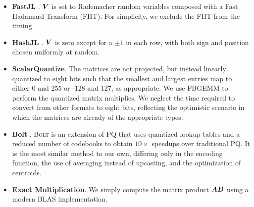 \begin{itemize}
    \item \textbf{FastJL} \cite{fastjl}. $\bm{V}$ is set to Rademacher random variables composed with a Fast Hadamard Transform (FHT). For simplicity, we exclude the FHT from the timing.
    \item \textbf{HashJL} \cite{hashjl}. $\bm{V}$ is zero except for a $\pm 1$ in each row, with both sign and position chosen uniformly at random.
    \item \textbf{ScalarQuantize}. The matrices are not projected, but instead linearly quantized to eight bits such that the smallest and largest entries map to
    either 0 and 255 or -128 and 127, as appropriate.
    We use FBGEMM \cite{fbgemm} to perform the quantized matrix multiplies. We neglect the time required to convert from other formats to eight bits, reflecting the optimistic scenario in which the matrices are already of the appropriate types.
    \item \textbf{Bolt} \cite{bolt}. \textsc{Bolt} is an extension of PQ that uses quantized lookup tables and a reduced number of codebooks to obtain $10\times$ speedups over traditional PQ. It is the most similar method to our own, differing only in the encoding function, the use of averaging instead of upcasting, and the optimization of centroids. %
    \item \textbf{Exact Multiplication}. We simply compute the matrix product $\bm{A}\bm{B}$ using a modern BLAS implementation.
\end{itemize}
